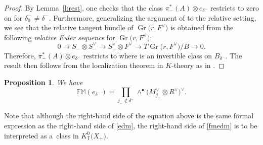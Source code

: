 \documentclass[pdftex]{sigma}
\newtheorem{Proposition}[Theorem]{Proposition}
 { \theoremstyle{definition}
\newtheorem{Definition}[Theorem]{Definition}
\newtheorem{Note}[Theorem]{Note}
\newtheorem{Example}[Theorem]{Example}
\newtheorem{Remark}[Theorem]{Remark} }
\numberwithin{equation}{section}
\newcommand{\torus}{\mathbb{T}}
\newcommand{\FM}{\mathbb{FM}}
\DeclareMathOperator{\Gr}{Gr}
\newcommand{\F}{F}
\newcommand{\MB}{M}
\begin{document}
\begin{proof}
By Lemma~\ref{l:rest}, one checks that the class $\pi_-^*(A) \otimes e_{\delta^-}$ restricts to zero on  for $\delta_0^- \neq \delta^-$. Furthermore, generalizing the argument of \cite[Section~5.1]{CKM14} to the relative setting, we see that the relative tangent bundle of $\Gr\bigl(r, \F^\vee\bigr)$ is obtained from the following \emph{relative Euler sequence} for $\Gr\bigl(r, F^\vee\bigr)$:
\begin{equation}\label{e:Euler} 0 \rightarrow S_{-} \otimes S_{-}^\vee \rightarrow S_{-}^\vee \otimes F^\vee \rightarrow T\Gr\bigl(r, \F^\vee\bigr)/ B \rightarrow 0.\end{equation} Therefore, $\pi_-^*(A) \otimes e_{\delta^-}$ restricts to \smash{$A \otimes \wedge^\bullet N_{B_{\delta^-}|\Gr(r, \F^\vee)}^\vee$} where \smash{$\wedge^\bullet N_{B_{\delta^-}|\Gr(r, \F^\vee)}^\vee$} is an invertible class on $B_{\delta^-}$. The result then follows from the localization theorem in $K$-theory as in \mbox{\cite[Section~2.3]{Oko15}}.
\end{proof}

\begin{Proposition}
We have
\begin{equation}\label{fmedm}
\FM(e_{\delta^-}) = \prod_{j_- \notin \delta^-} \wedge^\bullet \bigl(\MB_{j_-}^\vee \otimes R^\vee\bigr)^\vee.
\end{equation}
\end{Proposition}

\begin{Remark}
 Note that although the right-hand side of the equation above is the same formal expression as the right-hand side of \eqref{edm}, the right-hand side of \eqref{fmedm} is to be interpreted as a~class in $K^0_\torus\bigl(X_+\bigr)$.
\end{Remark}
\end{document}
